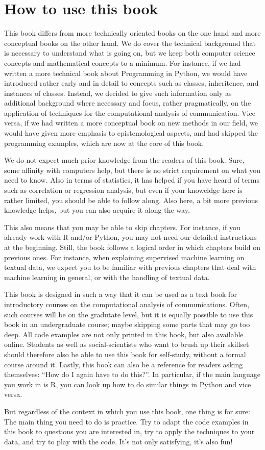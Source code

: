 \section{How to use this book}

This book differs from more technically oriented books on the one hand
and more conceptual books on the other hand. We do cover the technical
background that is necessary to understand what is going on, but we
keep both computer science concepts and mathematical concepts to a
minimum. For instance, if we had written a more technical book about
Programming in Python, we would have introduced rather early and in
detail to concepts such as classes, inheritence, and instances of
classes. Instead, we decided to give such information only as
additional background where necessary and focus, rather pragmatically,
on the application of techniques for the computational analysis of
communication. Vice versa, if we had written a more conceptual book on
new methods in our field, we would have given more emphasis to
epistemological aspects, and had skipped the programming examples,
which are now at the core of this book.

We do not expect much prior knowledge from the readers of this
book. Sure, some affinity with computers help, but there is no strict
requirement on what you need to know. Also in terms of statistics, it
has helped if you have heard of terms such as correlation or
regression analysis, but even if your knoweldge here is rather
limited, you should be able to follow along. Also here, a bit more
previous knowledge helps, but you can also acquire it along the way.

This also means that you may be able to skip chapters. For instance,
if you already work with R and/or Python, you may not need our
detailed instructions at the beginning. Still, the book follows a
logical order in which chapters build on previous ones. For instance,
when explaining supervised machine learning on textual data, we expect
you to be familiar with previous chapters that deal with machine
learning in general, or with the handling of textual data.

This book is designed in such a way that it can be used as a text book
for introductory courses on the computational analysis of
communications. Often, such courses will be on the gradutate level,
but it is equally possible to use this book in an undergraduate
course; maybe skipping some parts that may go too deep. All code
examples are not only printed in this book, but also available
online. Students as well as social-scientists who want to brush up
their skillset should therefore also be able to use this book for
self-study, without a formal course around it. Lastly, this book can
also be a reference for readers asking themselves: ``How do I again
have to do this?''. In particular, if the main language you work in is
R, you can look up how to do similar things in Python and vice versa.

But regardless of the context in which you use this book, one thing is
for sure: The main thing you need to do is practice. Try to adapt the
code examples in this book to questions you are interested in, try to
apply the techniques to your data, and try to play with the code. It's
not only satisfying, it's also fun!

